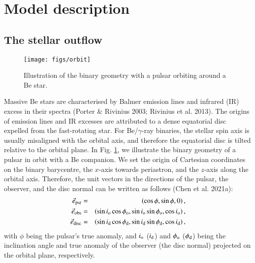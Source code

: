 \documentclass{aa}
\begin{document}
\section{Model description}

\subsection{The stellar outflow}
\begin{figure}
  \centering
  \texttt{[image: figs/orbit]}
  \caption{Illustration of the binary geometry with a pulsar orbiting around a Be star.} \label{fig:orbit}
\end{figure}




Massive Be stars are characterised by Balmer emission lines and infrared (IR) excess in their spectra (Porter \& Rivinius 2003; Rivinius et al. 2013). The origins of emission lines and IR excesses are attributed to a dense equatorial disc expelled from the fast-rotating star.
For Be/$\gamma$-ray binaries, the stellar spin axis is usually misaligned with the orbital axis, and therefore the equatorial disc is tilted relative to the orbital plane.
In Fig. \ref{fig:orbit}, we illustrate the binary geometry of a pulsar in orbit with a Be companion. We set the origin of Cartesian coordinates on the binary barycentre, the $x$-axis towards periastron, and the $z$-axis along the orbital axis. Therefore, the unit vectors in the directions of the pulsar, the observer, and the disc normal can be written as follows (Chen et al. 2021a):
\begin{eqnarray}\label{vecs}
  \vec{e}_{\rm{psr}} &=& \left( \cos \phi ,\sin \phi ,0 \right), \\
  \vec{e}_{\rm{obs}} &=& \left( \sin i_{\rm{o}}\cos \phi _{\rm{o}},
  \sin i_{\rm{o}}\sin \phi _{\rm{o}}, \cos i_{\rm{o}} \right),\\
  \vec{e}_{\rm{disc}} &=& \left( \sin i_{\rm{d}}\cos \phi _{\rm{d}}, \sin i_{\rm{d}}\sin \phi _{\rm{d}}, \cos i_{\rm{d}} \right),
\end{eqnarray}
with $\phi$ being the pulsar's true anomaly, and $i_{\rm o}$ ($i_{\rm d}$) and $\phi_{\rm o}$ ($\phi_{\rm d}$) being the inclination angle and true anomaly of the observer (the disc normal) projected on the orbital plane, respectively.
\end{document}
